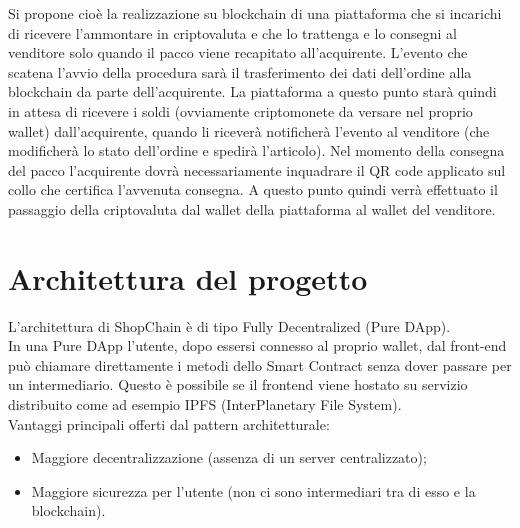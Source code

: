 Si propone cioè la realizzazione su blockchain di una piattaforma che si incarichi di ricevere l’ammontare in criptovaluta e che lo trattenga e lo consegni al venditore solo quando il pacco viene recapitato all’acquirente. L’evento che scatena l’avvio della procedura sarà il trasferimento dei dati dell’ordine alla blockchain da parte dell’acquirente. La piattaforma a questo punto starà quindi in attesa di ricevere i soldi (ovviamente criptomonete da versare nel proprio wallet) dall’acquirente, quando li riceverà notificherà l’evento al venditore (che modificherà lo stato dell’ordine e spedirà l’articolo). Nel momento della consegna del pacco l’acquirente dovrà necessariamente inquadrare il QR code applicato sul collo che certifica l’avvenuta consegna. A questo punto quindi verrà effettuato il passaggio della criptovaluta dal wallet della piattaforma al wallet del venditore.\\

\newpage
\section{Architettura del progetto}
L’architettura di ShopChain è di tipo Fully Decentralized (Pure DApp).\\
In una Pure DApp l'utente, dopo essersi connesso al proprio wallet, dal front-end può chiamare direttamente i metodi dello Smart Contract senza dover passare per un intermediario.
Questo è possibile se il frontend viene hostato su servizio distribuito come ad esempio IPFS (InterPlanetary File System).\cite{site:ipfs}\\[0.2cm]
Vantaggi principali offerti dal pattern architetturale:
\begin{itemize}
    \item Maggiore decentralizzazione (assenza di un server centralizzato);
    \item Maggiore sicurezza per l'utente (non ci sono intermediari tra di esso e la blockchain).
\end{itemize}

